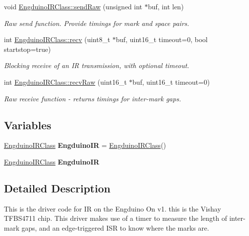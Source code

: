 \begin{DoxyCompactItemize}
void \hyperlink{group___engduino_i_r_gadd747831975bc37388f0ad27f6085c60}{Engduino\+I\+R\+Class\+::send\+Raw} (unsigned int $\ast$buf, int len)
\begin{DoxyCompactList}\small\item\em Raw send function. Provide timings for mark and space pairs. \end{DoxyCompactList}\item 
int \hyperlink{group___engduino_i_r_gaca86f6ca262e5a77553535000f0b24a9}{Engduino\+I\+R\+Class\+::recv} (uint8\+\_\+t $\ast$buf, uint16\+\_\+t timeout=0, bool startstop=true)
\begin{DoxyCompactList}\small\item\em Blocking receive of an I\+R transmission, with optional timeout. \end{DoxyCompactList}\item 
int \hyperlink{group___engduino_i_r_ga62662ec690cb14fbd4b0bb511880cc77}{Engduino\+I\+R\+Class\+::recv\+Raw} (uint16\+\_\+t $\ast$buf, uint16\+\_\+t timeout=0)
\begin{DoxyCompactList}\small\item\em Raw receive function -\/ returns timings for inter-\/mark gaps. \end{DoxyCompactList}\end{DoxyCompactItemize}
\subsection*{Variables}
\begin{DoxyCompactItemize}
\item 
\hypertarget{group___engduino_i_r_gab19554127bd1371c6b99792621db1960}{}\hyperlink{class_engduino_i_r_class}{Engduino\+I\+R\+Class} {\bfseries Engduino\+I\+R} = \hyperlink{class_engduino_i_r_class}{Engduino\+I\+R\+Class}()\label{group___engduino_i_r_gab19554127bd1371c6b99792621db1960}

\item 
\hypertarget{group___engduino_i_r_gab19554127bd1371c6b99792621db1960}{}\hyperlink{class_engduino_i_r_class}{Engduino\+I\+R\+Class} {\bfseries Engduino\+I\+R}\label{group___engduino_i_r_gab19554127bd1371c6b99792621db1960}

\end{DoxyCompactItemize}


\subsection{Detailed Description}
This is the driver code for I\+R on the Engduino On v1. this is the Vishay T\+F\+B\+S4711 chip. This driver makes use of a timer to measure the length of inter-\/mark gaps, and an edge-\/triggered I\+S\+R to know where the marks are.

